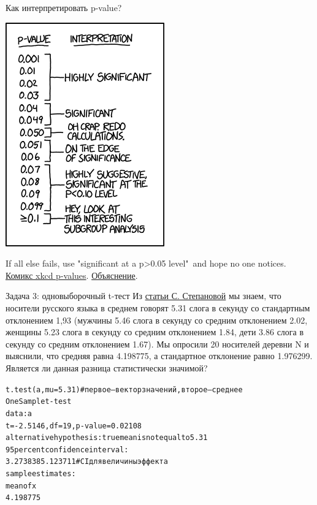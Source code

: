 \begin{frame}{Как интерпретировать p-value?}
\begin{center}
\includegraphics[width=0.45\linewidth]{ifall.png}
\end{center}
\vspace{-5mm}
If all else fails, use "significant at a p>0.05 level"\ and hope no one notices.
\\
\href{https://xkcd.com/1478/}{\alert{Комикс xkcd p-values}}. \href{http://www.explainxkcd.com/wiki/index.php/P-Values}{\alert{Объяснение}}.
\end{frame}
\begin{frame}{Задача 3: одновыборочный t-тест}
Из \href{https://www.internationalphoneticassociation.org/icphs-proceedings/ICPhS2011/OnlineProceedings/RegularSession/Stepanova/Stepanova.pdf}{\alert{статьи С. Степановой}} мы знаем, что носители русского языка в среднем говорят 5.31 слога в секунду со стандартным отклонением 1,93 (мужчины 5.46 слога в секунду  со средним отклонением 2.02, женщины 5.23 слога в секунду  со средним отклонением 1.84, дети 3.86 слога в секунду со средним отклонением 1.67). Мы опросили 20 носителей деревни N и выяснили, что средняя равна 4.198775, а стандартное отклонение равно 1.976299. Является ли данная разница статистически значимой?
\vfill
\scriptsize
\begin{alltt}
\alert{t.test(a, mu = 5.31)} \hfill \# первое — вектор значений, второе — среднее\medskip\\
One Sample t-test\\
data:  a\\
\alert{t = -2.5146, df = 19, p-value = 0.02108}\\
alternative hypothesis: true mean is not equal to 5.31\\
95 percent confidence interval:\\
 3.273838 5.123711 \hfill \# CI для величины эффекта\\
sample estimates:\\
mean of x \\
 4.198775 
\end{alltt}
\normalsize
\end{frame}
